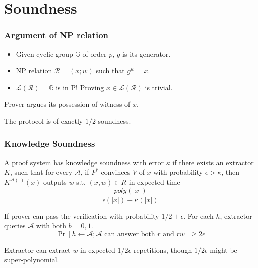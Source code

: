 \documentclass[UFT8]{beamer}
\begin{document}
\section{{Soundness}}

\begin{frame}
    \frametitle{Argument of NP relation}
    \begin{itemize}
        \item Given cyclic group $\mathbb{G}$ of order $p$, $g$ is its generator. 
        \item NP relation $\mathcal{R} = (x; w)$ such that $g^w = x$.
        \item $\mathcal{L}(\mathcal{R}) = \mathbb{G}$ is in P! Proving $x\in \mathcal{L}(\mathcal{R})$ is trivial.
    \end{itemize}

    Prover argues its possession of witness of $x$.

    \quad


    The protocol is of exactly $1/2$-soundness.

\end{frame}

\begin{frame}
    \frametitle{Knowledge Soundness}
    \begin{definition}
        A proof system has knowledge soundness with error $\kappa$ if there exists an extractor $K$, such that for every $\mathcal{A}$, if $P^*$ convinces $V$ of $x$ with probability $\epsilon > \kappa$, then $K^{\mathcal{A}(\cdot)}(x)$ outputs $w$ s.t. $(x, w) \in R$ in expected time
        $$
        \frac{poly(|x|)}{\epsilon(|x|) - \kappa(|x|)}
        $$
    \end{definition}

    If prover can pass the verification with probability $1/2 + \epsilon$.
    For each $h$, extractor queries $\mathcal{A}$ with both $b = 0, 1$.
    \begin{equation*}
        \Pr[h \leftarrow \mathcal{A}; \mathcal{A} \text{ can answer both } r \text{ and } rw] \ge 2\epsilon
    \end{equation*}

    Extractor can extract $w$ in expected $1 / 2\epsilon$ repetitions, though $1 / 2\epsilon$ might be super-polynomial.
\end{frame}
\end{document}
